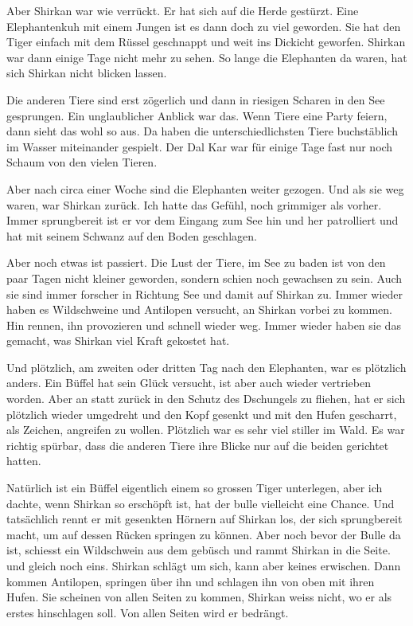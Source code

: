 Aber Shirkan war wie verrückt. Er hat sich auf die Herde gestürzt. Eine Elephantenkuh mit einem Jungen ist es dann doch zu viel geworden. Sie hat den Tiger einfach mit dem Rüssel geschnappt und weit ins Dickicht geworfen. Shirkan war dann einige Tage nicht mehr zu sehen. So lange die Elephanten da waren, hat sich Shirkan nicht blicken lassen.

Die anderen Tiere sind erst zögerlich und dann in riesigen Scharen in den See gesprungen. Ein unglaublicher Anblick war das. Wenn Tiere eine Party feiern, dann sieht das wohl so aus. Da haben die unterschiedlichsten Tiere buchstäblich im Wasser miteinander gespielt. Der Dal Kar war für einige Tage fast nur noch Schaum von den vielen Tieren.

Aber nach circa einer Woche sind die Elephanten weiter gezogen. Und als sie weg waren, war Shirkan zurück. Ich hatte das Gefühl, noch grimmiger als vorher. Immer sprungbereit ist er vor dem Eingang zum See hin und her patrolliert und hat mit seinem Schwanz auf den Boden geschlagen.

Aber noch etwas ist passiert. Die Lust der Tiere, im See zu baden ist von den paar Tagen nicht kleiner geworden, sondern schien noch gewachsen zu sein. Auch sie sind immer forscher in Richtung See und damit auf Shirkan zu. Immer wieder haben es Wildschweine und Antilopen versucht, an Shirkan vorbei zu kommen. Hin rennen, ihn provozieren und schnell wieder weg. Immer wieder haben sie das gemacht, was Shirkan viel Kraft gekostet hat. 

Und plötzlich, am zweiten oder dritten Tag nach den Elephanten, war es plötzlich anders. Ein Büffel hat sein Glück versucht, ist aber auch wieder vertrieben worden. Aber an statt zurück in den Schutz des Dschungels zu fliehen, hat er sich plötzlich wieder umgedreht und den Kopf gesenkt und mit den Hufen gescharrt, als Zeichen, angreifen zu wollen. Plötzlich war es sehr viel stiller im Wald. Es war richtig spürbar, dass die anderen Tiere ihre Blicke nur auf die beiden gerichtet hatten. 

Natürlich ist ein Büffel eigentlich einem so grossen Tiger unterlegen, aber ich dachte, wenn Shirkan so erschöpft ist, hat der bulle vielleicht eine Chance. Und tatsächlich rennt er mit gesenkten Hörnern auf Shirkan los, der sich sprungbereit macht, um auf dessen Rücken springen zu können. Aber noch bevor der Bulle da ist, schiesst ein Wildschwein aus dem gebüsch und rammt Shirkan in die Seite. und gleich noch eins. Shirkan schlägt um sich, kann aber keines erwischen. Dann kommen Antilopen, springen über ihn und schlagen ihn von oben mit ihren Hufen. Sie scheinen von allen Seiten zu kommen, Shirkan weiss nicht, wo er als erstes hinschlagen soll. Von allen Seiten wird er bedrängt. 

